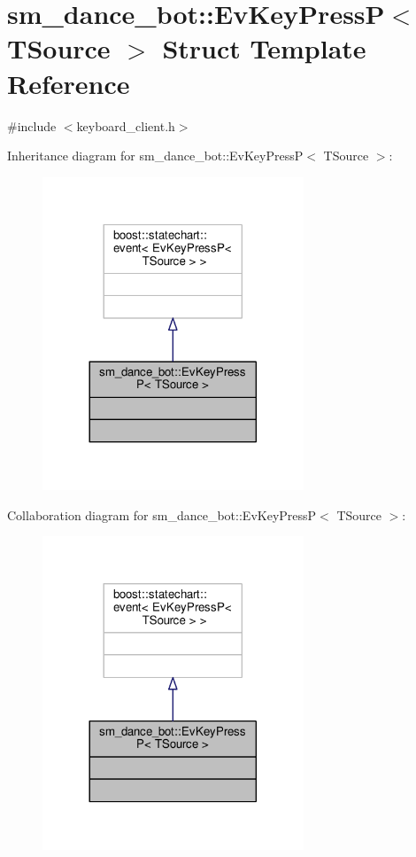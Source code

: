 \hypertarget{structsm__dance__bot_1_1EvKeyPressP}{}\section{sm\+\_\+dance\+\_\+bot\+:\+:Ev\+Key\+PressP$<$ T\+Source $>$ Struct Template Reference}
\label{structsm__dance__bot_1_1EvKeyPressP}


{\ttfamily \#include $<$keyboard\+\_\+client.\+h$>$}



Inheritance diagram for sm\+\_\+dance\+\_\+bot\+:\+:Ev\+Key\+PressP$<$ T\+Source $>$\+:
\nopagebreak
\begin{figure}[H]
\begin{center}
\leavevmode
\includegraphics[width=221pt]{structsm__dance__bot_1_1EvKeyPressP__inherit__graph}
\end{center}
\end{figure}


Collaboration diagram for sm\+\_\+dance\+\_\+bot\+:\+:Ev\+Key\+PressP$<$ T\+Source $>$\+:
\nopagebreak
\begin{figure}[H]
\begin{center}
\leavevmode
\includegraphics[width=221pt]{structsm__dance__bot_1_1EvKeyPressP__coll__graph}
\end{center}
\end{figure}


